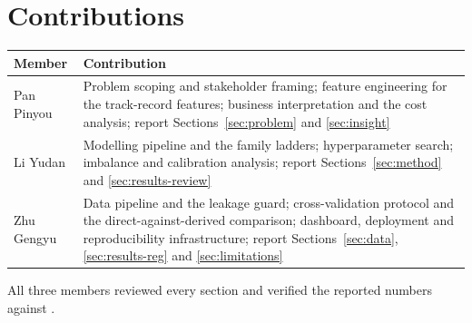 \section{Contributions}
\label{app:contributions}

\begin{center}
\small
\begin{tabular}{@{}lp{11.2cm}@{}}
\toprule
\textbf{Member} & \textbf{Contribution} \\
\midrule
Pan Pinyou & Problem scoping and stakeholder framing; feature engineering for the
track-record features; business interpretation and the cost analysis; report
Sections~\ref{sec:problem} and \ref{sec:insight} \\[3pt]
Li Yudan & Modelling pipeline and the family ladders; hyperparameter search;
imbalance and calibration analysis; report Sections~\ref{sec:method} and
\ref{sec:results-review} \\[3pt]
Zhu Gengyu & Data pipeline and the leakage guard; cross-validation protocol and
the direct-against-derived comparison; dashboard, deployment and reproducibility
infrastructure; report Sections~\ref{sec:data}, \ref{sec:results-reg} and
\ref{sec:limitations} \\
\bottomrule
\end{tabular}
\end{center}

All three members reviewed every section and verified the reported numbers
against .

